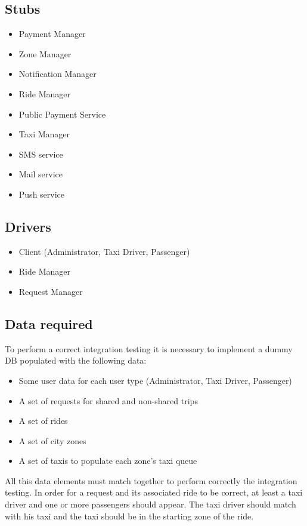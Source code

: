 \documentclass[a4paper,11pt]{report} %
\begin{document}
		\subsection{Stubs}
			\begin{itemize}
				\item Payment Manager
				\item Zone Manager
				\item Notification Manager
				\item Ride Manager
				\item Public Payment Service
				\item Taxi Manager
				\item SMS service
				\item Mail service
				\item Push service
			\end{itemize}
		\subsection{Drivers}
			\begin{itemize}
				\item Client (Administrator, Taxi Driver, Passenger)
				\item Ride Manager
				\item Request Manager
			\end{itemize}
		\subsection{Data required}
			To perform a correct integration testing it is necessary to implement a dummy DB populated with the following data:
			\begin{itemize}
				\item Some user data for each user type (Administrator, Taxi Driver, Passenger)
				\item A set of requests for shared and non-shared trips
				\item A set of rides
				\item A set of city zones
				\item A set of taxis to populate each zone’s taxi queue
			\end{itemize}
			All this data elements must match together to perform correctly the integration testing. In order for a request and its associated ride to be correct, at least a taxi driver and one or more passengers should appear. The taxi driver should match with his taxi and the taxi should be in the starting zone of the ride.
	
\end{document}
